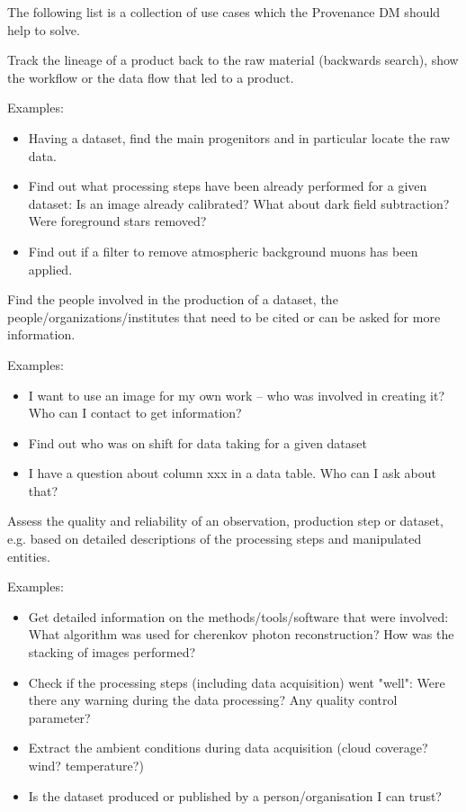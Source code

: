The following list is a collection of use cases which the Provenance DM should help to solve. 


        Track the lineage of a product back to the raw material (backwards search), show the
        workflow or the data flow that led to a product.

        \noindent Examples: 
        \begin{itemize}
            \item Having a dataset, find the main progenitors and in particular locate the raw data.
            \item Find out what processing steps have been already performed for a given dataset: Is an image already calibrated? What about dark field subtraction? Were foreground stars removed?
            \item Find out if a filter to remove atmospheric background muons has been applied.
        \end{itemize}


        Find the people involved in the production of a dataset, the people\slash{}organizations\slash{}institutes that need to be cited or can be asked for more information.

        \noindent Examples: 
        \begin{itemize}
            \item I want to use an image for my own work -- who was involved in creating it? Who can I contact to get information? 
            \item Find out who was on shift for data taking for a given dataset
            \item I have a question about column xxx in a data table. Who can I ask about that? 
        \end{itemize}


Assess the quality and reliability of an observation, production step or dataset, e.g. based on detailed descriptions of the processing steps and manipulated entities.
        
        \noindent Examples:
        \begin{itemize}
            \item Get detailed information on the methods/tools/software that were involved: What algorithm was used for cherenkov photon reconstruction? How was the stacking of images performed?
            \item Check if the processing steps (including data acquisition) went "well": Were there any warning during the data processing? Any quality control parameter?
            \item Extract the ambient conditions during data acquisition (cloud coverage? wind? temperature?)
            \item Is the dataset produced or published by a person\slash{}organisation I can trust?
        \end{itemize}


